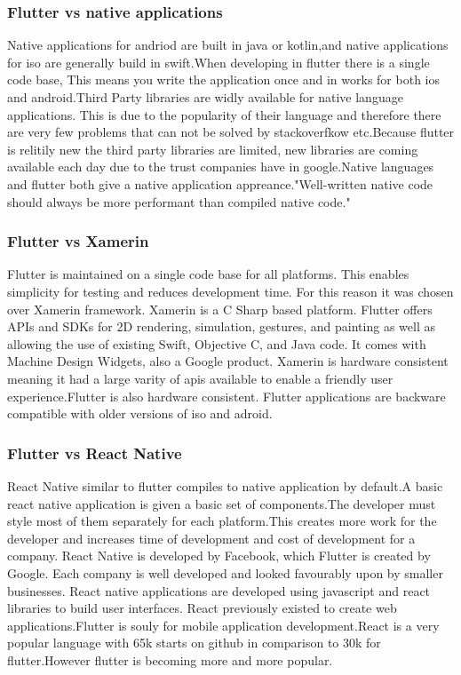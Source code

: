 \subsubsection{Flutter vs native applications}
Native applications for andriod are built in java or kotlin,and native applications for iso are generally build in swift.When developing in flutter there is a single code base, This means you write the application once and in works for both ios and android.Third Party libraries are widly available for native language applications. This is due to the popularity of their language and therefore there are very few problems that can not be solved by stackoverfkow etc.Because flutter is relitily new the third party libraries are limited, new libraries are coming available each day due to the trust companies have in google.Native languages and flutter both give a native application appreance."Well-written native code should always be more performant than compiled native code." \cite{FlutterVS_2018}


\subsubsection{Flutter vs Xamerin}
Flutter is maintained on a single code base for all platforms. This enables simplicity for testing and reduces development time. For this reason it was chosen over Xamerin framework. Xamerin is a C Sharp based platform. Flutter offers APIs and SDKs for 2D rendering, simulation, gestures, and painting as well as allowing the use of existing Swift, Objective C, and Java code. It comes with Machine Design Widgets, also a Google product. \cite{flutterVsXamarin}Xamerin is hardware consistent meaning it had a large varity of apis available to enable a friendly user experience.Flutter is also hardware consistent. Flutter applications are backware compatible with older versions of iso and adroid.\cite{flutterVsReactVsXamarin}

\subsubsection{Flutter vs React Native}
React Native similar to flutter compiles to native application by default.A basic react native application is given a basic set of components.The developer must style most of them separately for each platform.This creates more work for the developer and increases time of development and cost of development for a company. React Native is developed by Facebook, which Flutter is created by Google. Each company is well developed and looked favourably upon by smaller businesses. React native applications are developed using javascript and react libraries to build user interfaces. React previously existed to create web applications.Flutter is souly for mobile application development.React is a very popular language with 65k starts on github in comparison to 30k for flutter.However flutter is becoming more and more popular. \cite{FlutterVS_2018} \cite{ReactVsFlutterVsIonic}

